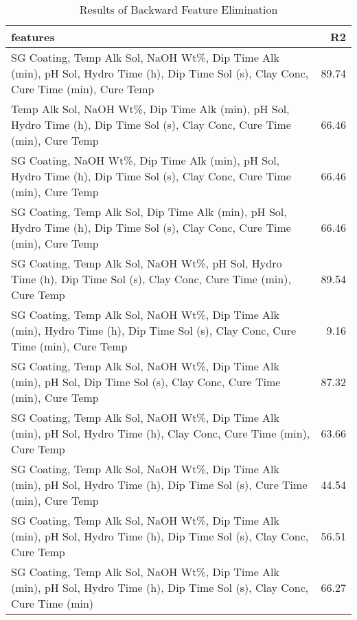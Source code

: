 
    \begin{table*}[h]
        \centering
        \begin{tabular}{lr}
\hline
 features                                                                                                                                 &    R2 \\
\hline
 SG Coating, Temp Alk Sol, NaOH Wt\%, Dip Time Alk (min), pH Sol, Hydro Time (h), Dip Time Sol (s), Clay Conc, Cure Time (min), Cure Temp & 89.74 \\
 Temp Alk Sol, NaOH Wt\%, Dip Time Alk (min), pH Sol, Hydro Time (h), Dip Time Sol (s), Clay Conc, Cure Time (min), Cure Temp             & 66.46 \\
 SG Coating, NaOH Wt\%, Dip Time Alk (min), pH Sol, Hydro Time (h), Dip Time Sol (s), Clay Conc, Cure Time (min), Cure Temp               & 66.46 \\
 SG Coating, Temp Alk Sol, Dip Time Alk (min), pH Sol, Hydro Time (h), Dip Time Sol (s), Clay Conc, Cure Time (min), Cure Temp            & 66.46 \\
 SG Coating, Temp Alk Sol, NaOH Wt\%, pH Sol, Hydro Time (h), Dip Time Sol (s), Clay Conc, Cure Time (min), Cure Temp                     & 89.54 \\
 SG Coating, Temp Alk Sol, NaOH Wt\%, Dip Time Alk (min), Hydro Time (h), Dip Time Sol (s), Clay Conc, Cure Time (min), Cure Temp         &  9.16 \\
 SG Coating, Temp Alk Sol, NaOH Wt\%, Dip Time Alk (min), pH Sol, Dip Time Sol (s), Clay Conc, Cure Time (min), Cure Temp                 & 87.32 \\
 SG Coating, Temp Alk Sol, NaOH Wt\%, Dip Time Alk (min), pH Sol, Hydro Time (h), Clay Conc, Cure Time (min), Cure Temp                   & 63.66 \\
 SG Coating, Temp Alk Sol, NaOH Wt\%, Dip Time Alk (min), pH Sol, Hydro Time (h), Dip Time Sol (s), Cure Time (min), Cure Temp            & 44.54 \\
 SG Coating, Temp Alk Sol, NaOH Wt\%, Dip Time Alk (min), pH Sol, Hydro Time (h), Dip Time Sol (s), Clay Conc, Cure Temp                  & 56.51 \\
 SG Coating, Temp Alk Sol, NaOH Wt\%, Dip Time Alk (min), pH Sol, Hydro Time (h), Dip Time Sol (s), Clay Conc, Cure Time (min)            & 66.27 \\
\hline
\end{tabular}
        \caption{Results of Backward Feature Elimination}
        \label{backward}
    \end{table*}
    
